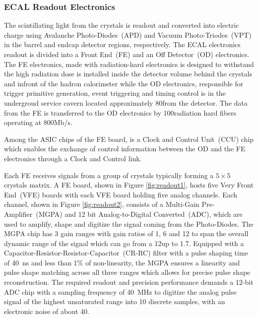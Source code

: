\subsubsection*{ECAL Readout Electronics}
The scintillating light from the \pb crystals is readout and converted into electric charge using Avalanche Photo-Diodes~(APD) and Vacuum Photo-Triodes~(VPT) in the barrel and endcap detector regions, respectively. 
\newline
The ECAL electronics readout is divided into a Front End~(FE) and an Off Detector~(OD) electronics. The FE electronics, made with radiation-hard electronics is designed to withstand the high radiation dose  is installed inside the detector volume behind the crystals and infront of the hadron calorimeter while the OD electronics, responsible for trigger primitive generation, event triggering and timing control is in the undergroud service cavern located approximately 80\m from the detector. The data from the FE is transferred to the OD electronics by 100\m radiation hard  fibers operating at 800Mb/s.
\par 
Among the ASIC chips of the FE board, is a Clock and Control Unit~(CCU) chip which enables the exchange of control information between the OD and the FE electronics through a Clock and Control link.
\par
Each FE receives signals from a group of crystals typically forming a $5\times5$ crystals matrix. A FE board, shown in Figure \ref{fig:readout1}, hosts five Very Front End~(VFE) boards with each VFE board holding five analog channels. Each channel, shown in Figure \ref{fig:readout2}, consists of a Multi-Gain Pre-Amplifier~(MGPA) and 12 bit Analog-to-Digital Converted~(ADC), which are used to amplify, shape and digitize the signal coming from the Photo-Diodes.
\newline
The MGPA chip has 3 gain ranges with gain ratios of 1, 6 and 12 to span the overall dynamic range of the signal which can go from a 12\MeV up to 1.7\TeV. Equipped with a Capacitor-Resistor-Resistor-Capacitor~(CR-RC) filter with a pulse shaping time of 40~ns and less than 1\% of non-linearity, the MGPA ensures a linearity and pulse shape matching across all three ranges which allows for precise pulse shape reconstruction.
\newline
The required readout and precision performance demands a 12-bit ADC chip with a sampling frequency of 40~MHz to digitize the analog pulse signal of the highest unsaturated range into 10 discrete samples, with an electronic noise  of about 40\MeV.
